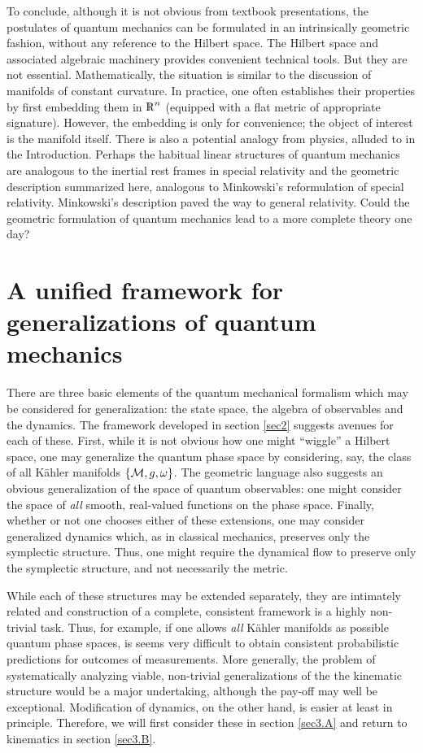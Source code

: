 \documentclass[12pt,aps,eqsecnum,tighten]{revtex4-2}
\def\M{{\cal M}}
\def\w{\omega}
\def\Rl{{\mathchoice 
{\setbox0=\hbox{$\displaystyle\rm R$}\hbox{\hbox to0pt
{\kern0.4\wd0\vrule height0.9\ht0\hss}\box0}}
{\setbox0=\hbox{$\textstyle\rm R$}\hbox{\hbox to0pt
{\kern0.4\wd0\vrule height0.9\ht0\hss}\box0}}
{\setbox0=\hbox{$\scriptstyle\rm R$}\hbox{\hbox to0pt
{\kern0.4\wd0\vrule height0.9\ht0\hss}\box0}}
{\setbox0=\hbox{$\scriptscriptstyle\rm R$}\hbox{\hbox to0pt
{\kern0.4\wd0\vrule height0.9\ht0\hss}\box0}}}}
\def\Rl{{\mathchoice
{\setbox0=\hbox{$\displaystyle\rm R$}\hbox{\hbox to0pt
{\kern0.4\wd0\vrule height0.9\ht0\hss}\box0}}
{\setbox0=\hbox{$\textstyle\rm R$}\hbox{\hbox to0pt
{\kern0.4\wd0\vrule height0.9\ht0\hss}\box0}}
{\setbox0=\hbox{$\scriptstyle\rm R$}\hbox{\hbox to0pt
{\kern0.4\wd0\vrule height0.9\ht0\hss}\box0}}
{\setbox0=\hbox{$\scriptscriptstyle\rm R$}\hbox{\hbox to0pt
{\kern0.4\wd0\vrule height0.9\ht0\hss}\box0}}}}
\def\R{\Rl}
\begin{document}
To conclude, although it is not obvious from textbook presentations,
the postulates of quantum mechanics can be formulated in an
intrinsically geometric fashion, without any reference to the Hilbert
space. The Hilbert space and associated algebraic machinery provides
convenient technical tools. But they are not
essential. Mathematically, the situation is similar to the discussion
of manifolds of constant curvature.  In practice, one often
establishes their properties by first embedding them in $\R^n$
(equipped with a flat metric of appropriate signature). However, the
embedding is only for convenience; the object of interest is the
manifold itself. There is also a potential analogy from physics,
alluded to in the Introduction.  Perhaps the habitual linear
structures of quantum mechanics are analogous to the inertial rest
frames in special relativity and the geometric description summarized
here, analogous to Minkowski's reformulation of special relativity.
Minkowski's description paved the way to general relativity.  Could
the geometric formulation of quantum mechanics lead to a more complete
theory one day?


\section{A unified framework for generalizations of quantum 
mechanics} \label{sec3}

There are three basic elements of the quantum mechanical formalism
which may be considered for generalization: the state space, the
algebra of observables and the dynamics.  The framework developed in
section \ref{sec2} suggests avenues for each of these.  First, while
it is not obvious how one might ``wiggle'' a Hilbert space, one may
generalize the quantum phase space by considering, say, the class of
all K\"ahler manifolds $\{ \M, g, \w \}$.  The geometric language also
suggests an obvious generalization of the space of quantum
observables: one might consider the space of {\em all} smooth,
real-valued functions on the phase space.  Finally, whether or not one
chooses either of these extensions, one may consider generalized
dynamics which, as in classical mechanics, preserves only the
symplectic structure. Thus, one might require the dynamical flow to
preserve only the symplectic structure, and not necessarily the
metric.

While each of these structures may be extended separately, they are
intimately related and construction of a complete, consistent
framework is a highly non-trivial task. Thus, for example, if one
allows {\it all} K\"ahler manifolds as possible quantum phase spaces,
is seems very difficult to obtain consistent probabilistic predictions
for outcomes of measurements. More generally, the problem of
systematically analyzing viable, non-trivial generalizations of the
the kinematic structure would be a major undertaking, although the
pay-off may well be exceptional. Modification of dynamics, on the
other hand, is easier at least in principle. Therefore, we will first
consider these in section \ref{sec3.A} and return to kinematics in
section \ref{sec3.B}.
\end{document}
